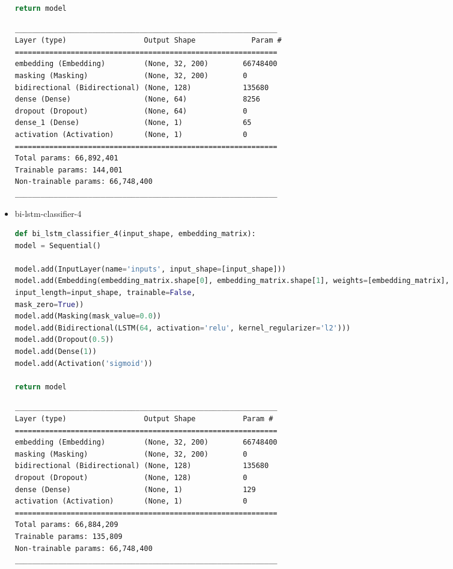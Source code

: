 \documentclass{article}
\begin{document}
\begin{itemize}
\begin{lstlisting}[language=Python, caption=Дефиниция на bi-lstm-classifier-2.]
return model
\end{lstlisting}

\begin{lstlisting}[numbers=none, caption=Обобщение на bi-lstm-classifier-2.]
_____________________________________________________________
Layer (type)                  Output Shape             Param #
=============================================================
embedding (Embedding)         (None, 32, 200)        66748400
masking (Masking)             (None, 32, 200)        0
bidirectional (Bidirectional) (None, 128)            135680
dense (Dense)                 (None, 64)             8256
dropout (Dropout)             (None, 64)             0
dense_1 (Dense)               (None, 1)              65
activation (Activation)       (None, 1)              0
=============================================================
Total params: 66,892,401
Trainable params: 144,001
Non-trainable params: 66,748,400
_____________________________________________________________
\end{lstlisting}

\item bi-lstm-classifier-4

\begin{lstlisting}[language=Python, caption=Дефиниция на bi-lstm-classifier-4.]
def bi_lstm_classifier_4(input_shape, embedding_matrix):
model = Sequential()

model.add(InputLayer(name='inputs', input_shape=[input_shape]))
model.add(Embedding(embedding_matrix.shape[0], embedding_matrix.shape[1], weights=[embedding_matrix],
input_length=input_shape, trainable=False,
mask_zero=True))
model.add(Masking(mask_value=0.0))
model.add(Bidirectional(LSTM(64, activation='relu', kernel_regularizer='l2')))
model.add(Dropout(0.5))
model.add(Dense(1))
model.add(Activation('sigmoid'))

return model
\end{lstlisting}

\begin{lstlisting}[numbers=none, caption=Обобщение на bi-lstm-classifier-4.]
_____________________________________________________________
Layer (type)                  Output Shape           Param #
=============================================================
embedding (Embedding)         (None, 32, 200)        66748400
masking (Masking)             (None, 32, 200)        0
bidirectional (Bidirectional) (None, 128)            135680
dropout (Dropout)             (None, 128)            0
dense (Dense)                 (None, 1)              129
activation (Activation)       (None, 1)              0
=============================================================
Total params: 66,884,209
Trainable params: 135,809
Non-trainable params: 66,748,400
_____________________________________________________________
\end{lstlisting}


\end{itemize}
\end{document}
